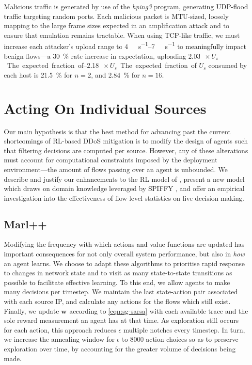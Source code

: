 \documentclass[conference, a4paper, 10pt, times]{IEEEtran}
\newcommand{\wvec}[1]{\ensuremath{\bm{w}_{#1}}}
\newcommand{\fakepara}[1]{\noindent\textbf{#1:}}
\begin{document}
Malicious traffic is generated by use of the \emph{hping3} program, generating UDP-flood traffic targeting random ports.
Each malicious packet is MTU-sized, loosely mapping to the large frame sizes expected in an amplification attack and to ensure that emulation remains tractable.
When using TCP-like traffic, we must increase each attacker's upload range to \SIrange{4}{7}{\mega\bit\per\second} to meaningfully impact benign flows---a \SI{30}{\percent} rate increase in expectation, uploading \SIrange{2.03}{2.18}{$\! \times U_s$}.
The expected fraction of $U_s$ consumed by each host is \SI{21.5}{\percent} for $n=2$, and \SI{2.84}{\percent} for $n=16$.

\section{Acting On Individual Sources}\label{sec:acting-on-individual-sources}
Our main hypothesis is that the best method for advancing past the current shortcomings of RL-based DDoS mitigation is to modify the design of agents such that filtering decisions are computed per source.
However, any of these alterations must account for computational constraints imposed by the deployment environment---the amount of flows passing over an agent is unbounded.
We describe and justify our enhancements to the RL model of \textcite{DBLP:journals/eaai/MalialisK15}, present a new model which draws on domain knowledge leveraged by SPIFFY \cite{DBLP:conf/ndss/KangGS16}, and offer an empirical investigation into the effectiveness of flow-level statistics on live decision-making.

\subsection{Marl++}\label{sec:marl-plus}
Modifying the frequency with which actions and value functions are updated has important consequences for not only overall system performance, but also in \emph{how} an agent learns.
We choose to adapt these algorithms to prioritise rapid response to changes in network state and to visit as many state-to-state transitions as possible to facilitate effective learning.
To this end, we allow agents to make many decisions per timestep.
We maintain the last state-action pair associated with each source IP, and calculate any actions for the flows which still exist.
Finally, we update $\wvec{}$ according to \cref{eqn:sg-sarsa} with each available trace and the sole reward measurement an agent has at that time.
As exploration still occurs for each action, this approach reduces $\epsilon$ multiple notches every timestep.
In turn, we increase the annealing window for $\epsilon$ to \num{8000} action choices so as to preserve exploration over time, by accounting for the greater volume of decisions being made.
\end{document}
